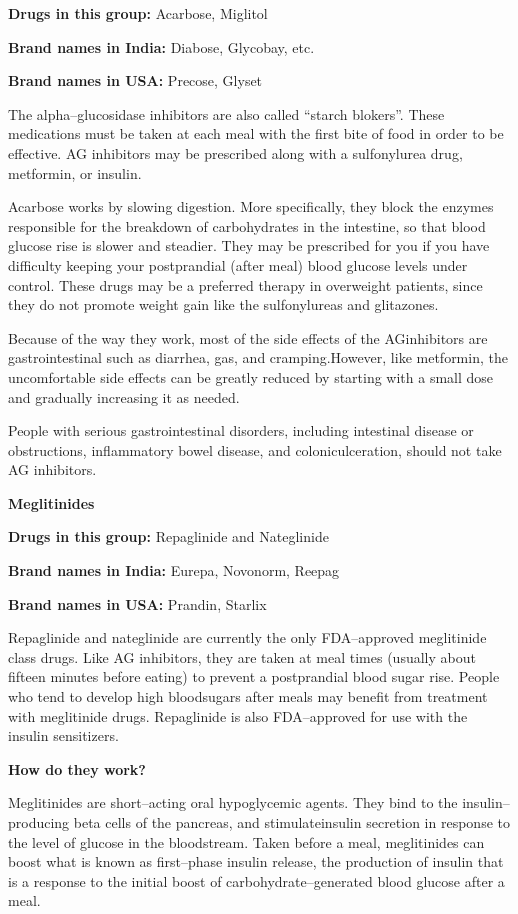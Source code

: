 \textbf{Drugs in this group:} Acarbose, Miglitol

\textbf{Brand names in India:} Diabose, Glycobay, etc.

\textbf{Brand names in USA:} Precose, Glyset

The alpha–glucosidase inhibitors are also called “starch blokers”. These medications must be taken at each meal with the first bite of food in order to be effective. AG inhibitors may be prescribed along with a sulfonylurea drug, metformin, or insulin.

Acarbose works by slowing digestion. More specifically, they block the enzymes responsible for the breakdown of carbohydrates in the intestine, so that blood glucose rise is slower and steadier. They may be prescribed for you if you have difficulty keeping your postprandial (after meal) blood glucose levels under control. These drugs may be a preferred therapy in overweight patients, since they do not promote weight gain like the sulfonylureas and glitazones.

Because of the way they work, most of the side effects of the AG\break inhibitors are gastrointestinal such as diarrhea, gas, and cramping.\break However, like metformin, the uncomfortable side effects can be greatly reduced by starting with a small dose and gradually increasing it as needed.

People with serious gastrointestinal disorders, including intestinal disease or obstructions, inflammatory bowel disease, and colonic\break ulceration, should not take AG inhibitors.

\textbf{Meglitinides}

\textbf{Drugs in this group:} Repaglinide and Nateglinide

\textbf{Brand names in India:} Eurepa, Novonorm, Reepag

\textbf{Brand names in USA:} Prandin, Starlix

Repaglinide and nateglinide are currently the only FDA–approved meglitinide class drugs. Like AG inhibitors, they are taken at meal times (usually about fifteen minutes before eating) to prevent a postprandial blood sugar rise. People who tend to develop high blood\break sugars after meals may benefit from treatment with meglitinide drugs. Repaglinide is also FDA–approved for use with the insulin sensitizers.

\vskip 4pt
\noindent\textbf{How do they work?}
\vskip 4pt

Meglitinides are short–acting oral hypoglycemic agents. They bind to the insulin–producing beta cells of the pancreas, and stimulate\break insulin secretion in response to the level of glucose in the bloodstream. Taken before a meal, meglitinides can boost what is known as first–phase insulin release, the production of insulin that is a response to the initial boost of carbohydrate–generated blood glucose after a meal.

